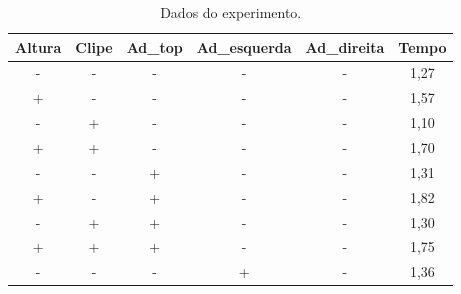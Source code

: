 \begin{table}[H]
  \centering
  \caption{Dados do experimento.}
  \begin{tabular}{|c|c|c|c|c|c|}
  \hline
  \rowcolor[HTML]{EFEFEF} 
  \textbf{Altura}           & \textbf{Clipe}            & \textbf{Ad\_top}          & \textbf{Ad\_esquerda}     & \textbf{Ad\_direita} & \textbf{Tempo}               \\ \hline
  \rowcolor[HTML]{FFFFFF} 
  -                         & -                         & -                         & -                         & -                    & 1,27                         \\ \hline
  \rowcolor[HTML]{EFEFEF} 
  +                         & -                         & -                         & -                         & -                    & 1,57                         \\ \hline
  \rowcolor[HTML]{FFFFFF} 
  -                         & +                         & -                         & -                         & -                    & 1,10                         \\ \hline
  \rowcolor[HTML]{EFEFEF} 
  +                         & +                         & -                         & -                         & -                    & 1,70                         \\ \hline
  \rowcolor[HTML]{FFFFFF} 
  -                         & -                         & +                         & -                         & -                    & 1,31                         \\ \hline
  \rowcolor[HTML]{EFEFEF} 
  +                         & -                         & +                         & -                         & -                    & 1,82                         \\ \hline
  \rowcolor[HTML]{FFFFFF} 
  -                         & +                         & +                         & -                         & -                    & 1,30                         \\ \hline
  \rowcolor[HTML]{EFEFEF} 
  +                         & +                         & +                         & -                         & -                    & 1,75                         \\ \hline
  \rowcolor[HTML]{FFFFFF} 
  -                         & -                         & -                         & +                         & -                    & 1,36                         \\ \hline

\end{tabular}
\end{table}

